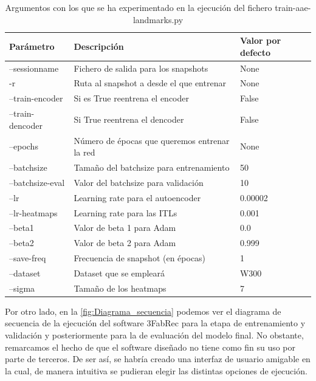 \begin{table}[!h]
    \centering
    \caption{Argumentos con los que se ha experimentado en la ejecución del fichero train-aae-landmarks.py}
    \begin{tabular}{|l|l|l|}
    \hline
        Parámetro & Descripción & Valor por defecto \\ \hline
        --sessionname & Fichero de salida para los snapshots & None \\ \hline
        -r & Ruta al snapshot a desde el que entrenar & None \\ \hline
        --train-encoder & Si es True reentrena el encoder & False \\ \hline
        --train-dencoder & Si True reentrena el dencoder & False \\ \hline
        --epochs & Número de épocas que queremos entrenar la red & None \\ \hline
        --batchsize & Tamaño del batchsize para entrenamiento & 50 \\ \hline
        --batchsize-eval & Valor del batchsize para validación & 10 \\ \hline
        --lr & Learning rate para el autoencoder & 0.00002 \\ \hline
        --lr-heatmaps & Learning rate para las ITLs & 0.001 \\ \hline
        --beta1 & Valor de beta 1 para Adam & 0.0 \\ \hline
        --beta2 & Valor de beta 2 para Adam & 0.999 \\ \hline
        --save-freq & Frecuencia de snapshot (en épocas) & 1 \\ \hline
        --dataset & Dataset que se empleará & W300 \\ \hline
        --sigma & Tamaño de los heatmaps & 7 \\ \hline
    \end{tabular}
    \label{table:Params}
\end{table}

\medskip

\noindent Por otro lado, en la \autoref{fig:Diagrama_secuencia} podemos ver el diagrama de secuencia de la ejecución del software 3FabRec para la etapa de entrenamiento y validación y posteriormente para la de evaluación del modelo final. No obstante, remarcamos el hecho de que el software diseñado no tiene como fin su uso por parte de terceros. De ser así, se habría creado una interfaz de usuario amigable en la cual, de manera intuitiva se pudieran elegir las distintas opciones de ejecución.

